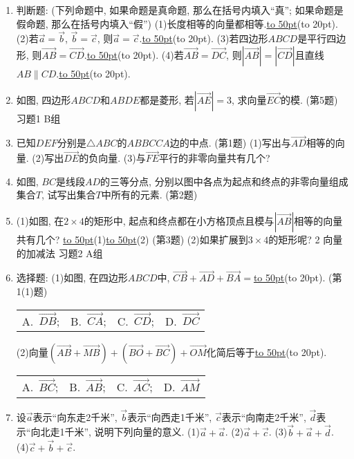 \documentclass[10pt,a4paper]{article}
\newcommand{\blank}[1]{\underline{\hbox to #1pt{}}}
\newcommand{\bracket}[1]{(\hbox to #1pt{})}
\newcommand{\fourch}[4]{\par\begin{tabular}{p{.23\textwidth}p{.23\textwidth}p{.23\textwidth}p{.23\textwidth}}
A.~#1 &B.~#2& C.~#3& D.~#4
\end{tabular}}
\begin{document}
\begin{enumerate}[1.]
\fourch{充分非必要条件;}{必要非充分条件;}{充要条件;}{既非充分又非必要条件}
(2)现有以下四个命题:
\textcircled{1} 时间、速度、加速度都是向量;
\textcircled{2} 向量的模是一个正实数;
\textcircled{3} 所有的单位向量都相等;
\textcircled{4} 零向量与任意非零向量平行.
其中真命题的个数是\blank{50}\bracket{20}.
\fourch{1;}{2;}{3;}{4}
\item 判断题: (下列命题中, 如果命题是真命题, 那么在括号内填入``真''; 如果命题是假命题, 那么在括号内填入``假'')
(1)长度相等的向量都相等.\blank{50}\bracket{20}.
(2)若$\overrightarrow a=\overrightarrow b$, $\overrightarrow b=\overrightarrow c$, 则$\overrightarrow a=\overrightarrow c$.\blank{50}\bracket{20}.
(3)若四边形$ABCD$是平行四边形, 则$\overrightarrow {AB}=\overrightarrow {CD}$.\blank{50}\bracket{20}.
(4)若$\overrightarrow {AB}=\overrightarrow {DC}$, 则$|\overrightarrow {AB}|=|\overrightarrow {CD}|$且直线$AB\parallel CD$.\blank{50}\bracket{20}.
\item 如图, 四边形$ABCD$和$ABDE$都是菱形, 若$|\overrightarrow {AE}|=3$, 求向量$\overrightarrow {EC}$的模.
(第5题)
习题1  B组
\item 已知$DEF$分别是$\triangle ABC$的$ABBCCA$边的中点.
(第1题)
(1)写出与$\overrightarrow {AD}$相等的向量.
(2)写出$\overrightarrow {DE}$的负向量.
(3)与$\overrightarrow {FE}$平行的非零向量共有几个?
\item 如图, $BC$是线段$AD$的三等分点, 分别以图中各点为起点和终点的非零向量组成集合$T$, 试写出集合$T$中所有的元素.
(第2题)
\item (1)如图, 在$2\times 4$的矩形中, 起点和终点都在小方格顶点且模与$|\overrightarrow {AB}|$相等的向量共有几个?
\blank{50}(1)\blank{50}(2)
(第3题)
(2)如果扩展到$3\times 4$的矩形呢?
2  向量的加减法
习题2  A组
\item 选择题:
(1)如图, 在四边形$ABCD$中, $\overrightarrow {CB}+\overrightarrow {AD}+\overrightarrow {BA}=$\blank{50}\bracket{20}.
(第1(1)题)
\fourch{$\overrightarrow {DB}$;}{$\overrightarrow {CA}$;}{$\overrightarrow {CD}$;}{$\overrightarrow {DC}$}
(2)向量$(\overrightarrow {AB}+\overrightarrow {MB})+(\overrightarrow {BO}+\overrightarrow {BC})+\overrightarrow {OM}$化简后等于\blank{50}\bracket{20}.
\fourch{$\overrightarrow {BC}$;}{$\overrightarrow {AB}$;}{$\overrightarrow {AC}$;}{$\overrightarrow {AM}$}
\item 设$\overrightarrow a$表示``向东走2千米'', $\overrightarrow b$表示``向西走1千米'', $\overrightarrow c$表示``向南走2千米'', $\overrightarrow d$表示``向北走1千米'', 说明下列向量的意义.
(1)$\overrightarrow a+\overrightarrow a$.								(2)$\overrightarrow a+\overrightarrow c$.
(3)$\overrightarrow b+\overrightarrow a+\overrightarrow d$.							(4)$\overrightarrow c+\overrightarrow b+\overrightarrow c$.

\end{enumerate}
\end{document}
